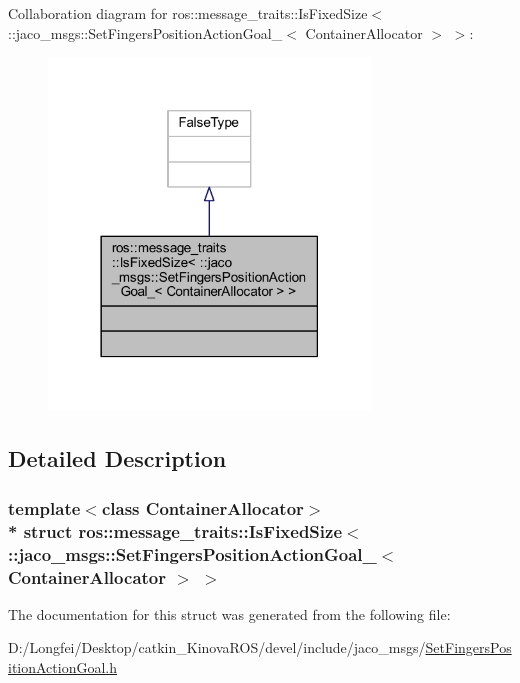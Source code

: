 Collaboration diagram for ros\+:\+:message\+\_\+traits\+:\+:Is\+Fixed\+Size$<$ \+:\+:jaco\+\_\+msgs\+:\+:Set\+Fingers\+Position\+Action\+Goal\+\_\+$<$ Container\+Allocator $>$ $>$\+:
\nopagebreak
\begin{figure}[H]
\begin{center}
\leavevmode
\includegraphics[width=242pt]{d3/d5a/structros_1_1message__traits_1_1IsFixedSize_3_01_1_1jaco__msgs_1_1SetFingersPositionActionGoal__dafd76778784cf971826a8c89efb4d57}
\end{center}
\end{figure}


\subsection{Detailed Description}
\subsubsection*{template$<$class Container\+Allocator$>$\\*
struct ros\+::message\+\_\+traits\+::\+Is\+Fixed\+Size$<$ \+::jaco\+\_\+msgs\+::\+Set\+Fingers\+Position\+Action\+Goal\+\_\+$<$ Container\+Allocator $>$ $>$}



The documentation for this struct was generated from the following file\+:\begin{DoxyCompactItemize}
\item 
D\+:/\+Longfei/\+Desktop/catkin\+\_\+\+Kinova\+R\+O\+S/devel/include/jaco\+\_\+msgs/\hyperlink{SetFingersPositionActionGoal_8h}{Set\+Fingers\+Position\+Action\+Goal.\+h}\end{DoxyCompactItemize}
